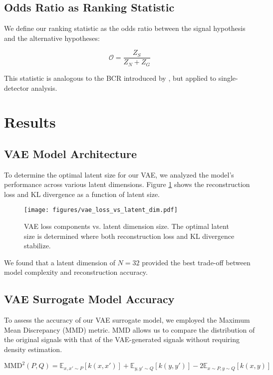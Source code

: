 \documentclass[twocolumn]{aastex631}
\begin{document}
\subsection{Odds Ratio as Ranking Statistic}
We define our ranking statistic as the odds ratio between the signal hypothesis and the alternative hypotheses:

\begin{equation}
\mathcal{O} = \frac{Z_S}{Z_N + Z_G}    
\end{equation}

This statistic is analogous to the BCR introduced by \citet{Isi:2018:PhRvD}, but applied to single-detector analysis.

\section{Results}


\subsection{VAE Model Architecture}
To determine the optimal latent size for our VAE, we analyzed the model's performance across various latent dimensions. 
Figure \ref{fig:vae_loss} shows the reconstruction loss and KL divergence as a function of latent size.

\begin{figure}[h]
    \centering
    \texttt{[image: figures/vae\_loss\_vs\_latent\_dim.pdf]}
    \caption{VAE loss components vs. latent dimension size. The optimal latent size is determined where both reconstruction loss and KL divergence stabilize.}
    \label{fig:vae_loss}
\end{figure}

We found that a latent dimension of $N=32$ provided the best trade-off between model complexity and reconstruction accuracy.

\subsection{VAE Surrogate Model Accuracy}
To assess the accuracy of our VAE surrogate model, we employed the Maximum Mean Discrepancy (MMD) metric. 
MMD allows us to compare the distribution of the original signals with that of the VAE-generated signals without requiring density estimation.

\begin{equation}
    \text{MMD}^2(P,Q) = \mathbb{E}_{x,x'\sim P}[k(x,x')] + \mathbb{E}_{y,y'\sim Q}[k(y,y')] - 2\mathbb{E}_{x\sim P,y\sim Q}[k(x,y)]
\end{equation}
\end{document}
